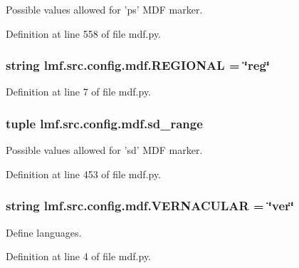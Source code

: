 Possible values allowed for 'ps' M\+D\+F marker. 



Definition at line 558 of file mdf.\+py.

\hypertarget{namespacelmf_1_1src_1_1config_1_1mdf_ab52ee069b7cd6fa8b52afa15ea6f221e}{
\subsubsection[{R\+E\+G\+I\+O\+N\+A\+L}]{\setlength{\rightskip}{0pt plus 5cm}string lmf.\+src.\+config.\+mdf.\+R\+E\+G\+I\+O\+N\+A\+L = \char`\"{}reg\char`\"{}}}\label{namespacelmf_1_1src_1_1config_1_1mdf_ab52ee069b7cd6fa8b52afa15ea6f221e}


Definition at line 7 of file mdf.\+py.

\hypertarget{namespacelmf_1_1src_1_1config_1_1mdf_a69afee1e13ba980f4da1e6d7fb0c488a}{
\subsubsection[{sd\+\_\+range}]{\setlength{\rightskip}{0pt plus 5cm}tuple lmf.\+src.\+config.\+mdf.\+sd\+\_\+range}}\label{namespacelmf_1_1src_1_1config_1_1mdf_a69afee1e13ba980f4da1e6d7fb0c488a}


Possible values allowed for 'sd' M\+D\+F marker. 



Definition at line 453 of file mdf.\+py.

\hypertarget{namespacelmf_1_1src_1_1config_1_1mdf_ae964bee79f865adc071d72a678dde128}{
\subsubsection[{V\+E\+R\+N\+A\+C\+U\+L\+A\+R}]{\setlength{\rightskip}{0pt plus 5cm}string lmf.\+src.\+config.\+mdf.\+V\+E\+R\+N\+A\+C\+U\+L\+A\+R = \char`\"{}ver\char`\"{}}}\label{namespacelmf_1_1src_1_1config_1_1mdf_ae964bee79f865adc071d72a678dde128}


Define languages. 



Definition at line 4 of file mdf.\+py.

